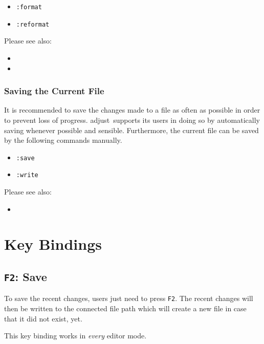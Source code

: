 \documentclass[11pt, a4paper, british]{scrartcl}
\DeclareRobustCommand{\adjust}{\textsf{adjust}}
\begin{document}
\begin{itemize}
\item \texttt{:format}
\item \texttt{:reformat}
\end{itemize}

Please see also:

\begin{itemize}
\item {}
\item {}
\end{itemize}

\subsubsection{Saving the Current File}
\label{sec:saving-the-current-file}
It is recommended to save the changes made to a file as often as possible in
order to prevent loss of progress.  \adjust\ supports its users in doing so by
automatically saving whenever possible and sensible.  Furthermore, the current
file can be saved by the following commands manually.

\begin{itemize}
\item \texttt{:save}
\item \texttt{:write}
\end{itemize}

Please see also:

\begin{itemize}
\item {}
\end{itemize}


\newpage
\section{Key Bindings}
\label{sec:key-bindings}
\subsection{\texttt{F2}:  Save}
\label{sec:f2-save}
To save the recent changes, users just need to press \texttt{F2}.  The recent
changes will then be written to the connected file path which will create a new
file in case that it did not exist, yet.

This key binding works in \emph{every} editor mode.
\end{document}
